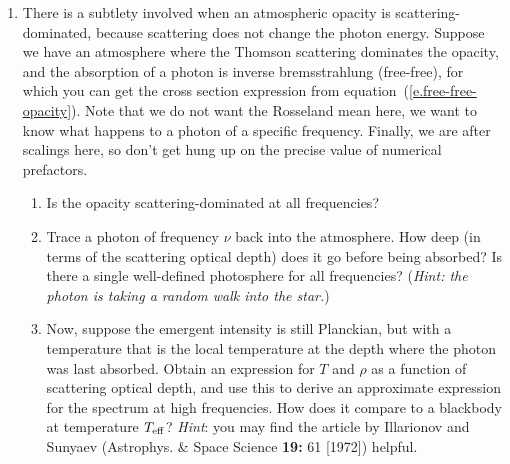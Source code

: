 \begin{enumerate}
\item There is a subtlety involved when an atmospheric opacity is scattering-dominated, because scattering does not change the photon energy. Suppose we have an atmosphere where the Thomson scattering dominates the opacity, and the absorption of a photon is inverse bremsstrahlung (free-free), for which you can get the cross section expression from equation~(\ref{e.free-free-opacity}).  Note that we do not want the Rosseland mean here, we want to know what happens to a photon of a specific frequency. Finally, we are after scalings here, so don't get hung up on the precise value of numerical prefactors.
\begin{enumerate}
\item Is the opacity scattering-dominated at all frequencies?
\item Trace a photon of frequency $\nu$ back into the atmosphere.  How deep (in terms of the scattering optical depth) does it go before being absorbed? Is there a single well-defined photosphere for all frequencies? (\emph{Hint: the photon is taking a random walk into the star.})
\item Now, suppose the emergent intensity is still Planckian, but with a temperature that is the local temperature at the depth where the photon was last absorbed. Obtain an expression for $T$ and $\rho$ as a function of scattering optical depth, and use this to derive an approximate expression for the spectrum at high frequencies.  How does it compare to a blackbody at temperature $T_{\mathrm{eff}}$?
\emph{Hint}: you may find the article by Illarionov and Sunyaev (Astrophys. \& Space Science \textbf{19:} 61 [1972]) helpful.
\end{enumerate}
\end{enumerate}



